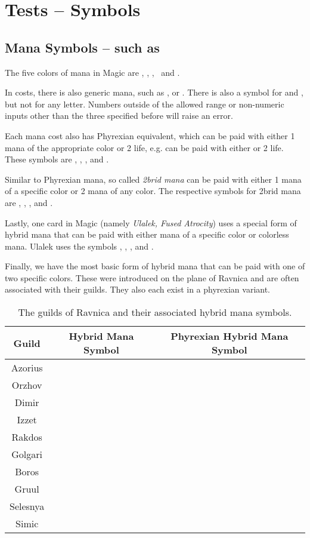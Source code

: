 \documentclass[a4paper]{scrartcl}
\begin{document}
	\section*{Tests -- Symbols}

	\subsection*{Mana Symbols -- such as \mtgUR}
	The five colors of mana in Magic are \mtgwhite, \mtgblue, \mtgblack, \mtgred\ and \mtggreen .

	In costs, there is also generic mana, such as ,  or .
	There is also a symbol for  and , but not for any letter.
	Numbers outside of the allowed range or non-numeric inputs other than the three specified before will raise an error.

	Each mana cost also has Phyrexian equivalent, which can be paid with either 1 mana of the appropriate color or 2 life, e.g. \mtgUP{} can be paid with either \mtgU{} or 2 life.
	These symbols are \mtgWP, \mtgUP, \mtgBP, \mtgRP{} and \mtgGP.

	Similar to Phyrexian mana, so called \emph{2brid mana} can be paid with either 1 mana of a specific color or 2 mana of any color.
	The respective symbols for 2brid mana are \mtgTwoW, \mtgTwoU, \mtgTwoB, \mtgTwoR{} and \mtgTwoG.

	Lastly, one card in Magic (namely \emph{Ulalek, Fused Atrocity}) uses a special form of hybrid mana that can be paid with either mana of a specific color or colorless mana.
	Ulalek uses the symbols \mtgCW, \mtgCU, \mtgCB, \mtgCR{} and \mtgCG.

	Finally, we have the most basic form of hybrid mana that can be paid with one of two specific colors.
	These were introduced on the plane of Ravnica and are often associated with their guilds.
	They also each exist in a phyrexian variant.
	\begin{table}[h]
		\begin{tabular}{c c c}
			\toprule
			\textbf{Guild} & \textbf{Hybrid Mana Symbol} & \textbf{Phyrexian Hybrid Mana Symbol}\\
			\midrule
			Azorius  & \mtgWU & \mtgWUP \\
			Orzhov   & \mtgWB & \mtgWBP \\
			Dimir    & \mtgUB & \mtgUBP \\
			Izzet    & \mtgUR & \mtgURP \\
			Rakdos   & \mtgBR & \mtgBRP \\
			Golgari  & \mtgBG & \mtgBGP \\
			Boros    & \mtgRW & \mtgRWP \\
			Gruul    & \mtgRG & \mtgRGP \\
			Selesnya & \mtgGW & \mtgGWP \\
			Simic    & \mtgGU & \mtgGUP \\
			\bottomrule
		\end{tabular}
		\caption{The guilds of Ravnica and their associated hybrid mana symbols.}
	\end{table}
\end{document}
